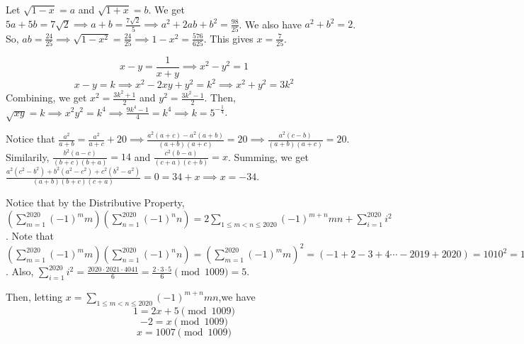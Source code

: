 \documentclass[11pt]{article}
\begin{document}

\begin{sol}
Let $\sqrt{1-x}=a$ and $\sqrt{1+x}=b$. We get $5a+5b=7\sqrt{2}\implies a+b=\frac{7\sqrt{2}}{5}\implies a^2+2ab+b^2 = \frac{98}{25}$. We also have $a^2+b^2=2$. So, $ab=\frac{24}{25}\implies \sqrt{1-x^2}=\frac{24}{25}\implies 1-x^2=\frac{576}{625}$. This gives $x=\boxed{\frac{7}{25}}$.
\end{sol}


\begin{sol}
$$x-y=\frac{1}{x+y}\implies x^2-y^2=1$$
$$x-y=k\implies x^2-2xy+y^2=k^2\implies x^2+y^2=3k^2$$
Combining, we get $x^2=\frac{3k^2+1}{2}$ and $y^2=\frac{3k^2-1}{2}$. Then, $\sqrt{xy}=k\implies x^2y^2=k^4\implies \frac{9k^4-1}{4}=k^4\implies k=5^{-\frac{1}{4}}$.
\end{sol}


\begin{sol}
Notice that $\frac{a^2}{a+b}=\frac{a^2}{a+c}+20\implies \frac{a^2(a+c)-a^2(a+b)}{(a+b)(a+c)}=20\implies \frac{a^2(c-b)}{(a+b)(a+c)}=20$. Similarily, $\frac{b^2(a-c)}{(b+c)(b+a)}=14$ and $\frac{c^2(b-a)}{(c+a)(c+b)}=x$. Summing, we get $\frac{a^{2}(c^2-b^2)+b^{2}(a^2-c^2)+c^2(b^2-a^2)}{(a+b)(b+c)(c+a)}=0=34+x\implies x = \boxed{-34}$.
\end{sol}

\begin{sol}
Notice that by the Distributive Property, $(\sum_{m=1}^{2020} (-1)^{m} m)(\sum_{n=1}^{2020} (-1)^{n} n) = 2\sum_{1\leq m < n\leq 2020} (-1)^{m+n}mn + \sum_{i=1}^{2020} i^2$.  Note that $(\sum_{m=1}^{2020} (-1)^{m} m)(\sum_{n=1}^{2020} (-1)^{n} n)=(\sum_{m=1}^{2020} (-1)^{m} m)^2=(-1+2-3+4\cdots -2019+2020)=1010^2=1\pmod{1009}$. Also, $\sum_{i=1}^{2020} i^2=\frac{2020\cdot 2021\cdot 4041}{6} =\frac{2\cdot 3\cdot 5}{6} \pmod{1009}=5$. 

Then, letting $x=\sum_{1\leq m < n\leq 2020} (-1)^{m+n}mn$,we have 
$$1=2x+5\pmod{1009}$$
$$-2=x\pmod{1009}$$
$$x=\boxed{1007} \pmod{1009}$$
\end{sol}
\end{document}
